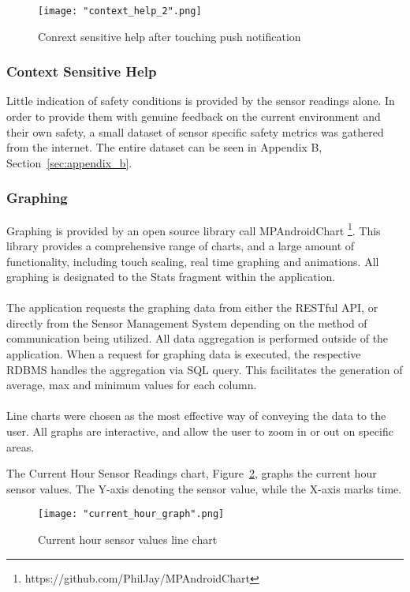 \documentclass{article}
\begin{document}
\begin{figure}[H]
\centering
\texttt{[image: "context\_help\_2".png]}
\caption{Conrext sensitive help after touching push notification}
\label{fig:android_pn_help}
\end{figure}

\subsubsection{Context Sensitive Help}
Little indication of safety conditions is provided by the sensor readings alone. In order to provide them with genuine feedback on the current environment and their own safety, a small dataset of sensor specific safety metrics was gathered from the internet. The entire dataset can be seen in Appendix B, Section~\ref{sec:appendix_b}.

\subsubsection{Graphing}
Graphing is provided by an open source library call MPAndroidChart \footnote{https://github.com/PhilJay/MPAndroidChart}. This library provides a comprehensive range of charts, and a large amount of functionality, including touch scaling, real time graphing and animations. All graphing is designated to the Stats fragment within the application.\\\\
The application requests the graphing data from either the RESTful API, or directly from the Sensor Management System depending on the method of communication being utilized. All data aggregation is performed outside of the application. When a request for graphing data is executed, the respective RDBMS handles the aggregation via SQL query. This facilitates the generation of average, max and minimum values for each column. \\\\
Line charts were chosen as the most effective way of conveying the data to the user. All graphs are interactive, and allow the user to zoom in or out on specific areas. 

\newpage
\noindent
The Current Hour Sensor Readings chart, Figure~\ref{fig:android_current_hour_chart}, graphs the current hour sensor values. The Y-axis denoting the sensor value, while the X-axis marks time.
\begin{figure}[H]
\centering
\texttt{[image: "current\_hour\_graph".png]}
\caption{Current hour sensor values line chart}
\label{fig:android_current_hour_chart}
\end{figure}
\end{document}
